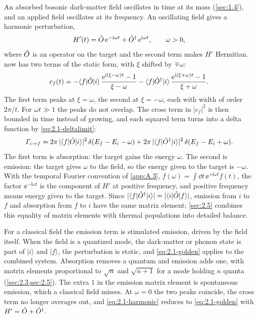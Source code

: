 An absorbed bosonic dark-matter field oscillates in time at its mass (\cref{sec:1.4}), and an applied field oscillates at its frequency. An oscillating field gives a harmonic perturbation,
\begin{equation*}
  H'(t) = \hat{O}\,\mathrm{e}^{-\mathrm{i}\omega t} + \hat{O}^\dagger\,\mathrm{e}^{\mathrm{i}\omega t}, \qquad \omega > 0,
\end{equation*}
where $\hat{O}$ is an operator on the target and the second term makes $H'$ Hermitian.  now has two terms of the static form, with $\xi$ shifted by $\mp\omega$:
\begin{equation*}
  c_f(t) = -\langle f|\hat{O}|i\rangle\,\frac{\mathrm{e}^{\mathrm{i}(\xi - \omega)t} - 1}{\xi - \omega} - \langle f|\hat{O}^\dagger|i\rangle\,\frac{\mathrm{e}^{\mathrm{i}(\xi + \omega)t} - 1}{\xi + \omega} .
\end{equation*}
The first term peaks at $\xi = \omega$, the second at $\xi = -\omega$, each with width of order $2\pi/t$. For $\omega t \gg 1$ the peaks do not overlap. The cross term in $|c_f|^2$ is then bounded in time instead of growing, and each squared term turns into a delta function by \cref{eq:2.1-deltalimit}:
\begin{equation}
  \varGamma_{i\to f} = 2\pi\,|\langle f|\hat{O}|i\rangle|^2\,\delta(E_f - E_i - \omega) + 2\pi\,|\langle f|\hat{O}^\dagger|i\rangle|^2\,\delta(E_f - E_i + \omega) .
  \label{eq:2.1-harmonic}
\end{equation}
The first term is absorption: the target gains the energy $\omega$. The second is emission: the target gives $\omega$ to the field, so the energy given to the target is $-\omega$. With the temporal Fourier convention of \cref{app:A.3}, $f(\omega) = \int\dd t\,\ee^{+\ii\omega t}f(t)$, the factor $\ee^{-\ii\omega t}$ is the component of $H'$ at positive frequency, and positive frequency means energy given to the target. Since $|\langle f|\hat{O}^\dagger|i\rangle| = |\langle i|\hat{O}|f\rangle|$, emission from $i$ to $f$ and absorption from $f$ to $i$ have the same matrix element; \cref{sec:2.5} combines this equality of matrix elements with thermal populations into detailed balance.

For a classical field the emission term is stimulated emission, driven by the field itself. When the field is a quantized mode, the dark-matter or phonon state is part of $|i\rangle$ and $|f\rangle$, the perturbation is static, and \cref{eq:2.1-golden} applies to the combined system. Absorption removes a quantum and emission adds one, with matrix elements proportional to $\sqrt{n}$ and $\sqrt{n + 1}$ for a mode holding $n$ quanta (\cref{sec:2.3,sec:2.5}). The extra $1$ in the emission matrix element is spontaneous emission, which a classical field misses. At $\omega = 0$ the two peaks coincide, the cross term no longer averages out, and \cref{eq:2.1-harmonic} reduces to \cref{eq:2.1-golden} with $H' = \hat{O} + \hat{O}^\dagger$.

